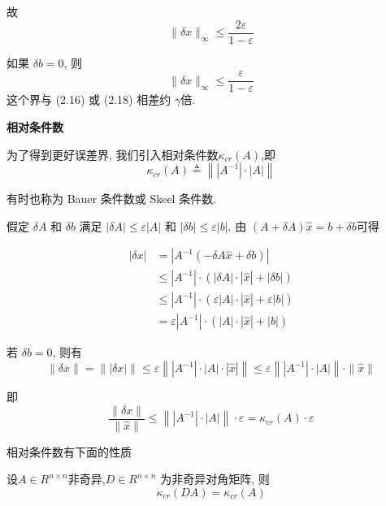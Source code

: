 \documentclass[12pt,a4paper]{article}
\begin{document}
\begin{framed}
	故
	\begin{equation}
	\|\delta x\|_{\infty} \leq \frac{2 \varepsilon}{1-\varepsilon}
	\end{equation}
	
	如果 $δb = 0$, 则
	\begin{equation}
	\|\delta x\|_{\infty} \leq \frac{\varepsilon}{1-\varepsilon}
	\end{equation}
	这个界与 (2.16) 或 (2.18) 相差约 $\gamma$倍.
\end{framed}

{\bfseries 相对条件数}

为了得到更好误差界, 我们引入相对条件数$\kappa_{cr}(A)$,即
\begin{equation}
\kappa_{c r}(A) \triangleq\left\|\left|A^{-1}\right| \cdot|A|\right\|
\end{equation}

有时也称为 Bauer 条件数或 Skeel 条件数.

假定 $δA$ 和 $δb$ 满足 $|δA| ≤ ε|A|$ 和 $|δb| ≤ ε|b|$. 由 $(A + δA)\hat{x} = b + δb $可得

\begin{equation}
\begin{aligned}|\delta x| &=\left|A^{-1}(-\delta A \hat{x}+\delta b)\right| \\ & \leq\left|A^{-1}\right| \cdot(|\delta A| \cdot|\hat{x}|+|\delta b|) \\ & \leq\left|A^{-1}\right| \cdot(\varepsilon|A| \cdot|\hat{x}|+\varepsilon|b|) \\ &=\varepsilon\left|A^{-1}\right| \cdot(|A| \cdot|\hat{x}|+|b|) \end{aligned}
\end{equation}

若 $δb = 0$, 则有
\begin{equation}
\|\delta x\|=\||\delta x|\| \leq \varepsilon\left\|\left|A^{-1}\right| \cdot|A| \cdot|\hat{x}|\right\| \leq \varepsilon\left\|\left|A^{-1}\right| \cdot|A|\right\| \cdot\|\hat{x}\|
\end{equation}

即
\begin{equation}
\frac{\|\delta x\|}{\|\hat{x}\|} \leq\left\|\left|A^{-1}\right| \cdot|A|\right\| \cdot \varepsilon=\kappa_{c r}(A) \cdot \varepsilon
\end{equation}

相对条件数有下面的性质
\begin{framed}
	\begin{lemma}
		设$ A∈ R^{n×n}$非奇异,$D ∈ R^{n×n}$ 为非奇异对角矩阵, 则
		\begin{equation}
		\kappa_{c r}(D A)=\kappa_{c r}(A)
		\end{equation}
	\end{lemma}
\end{framed}
\end{document}
